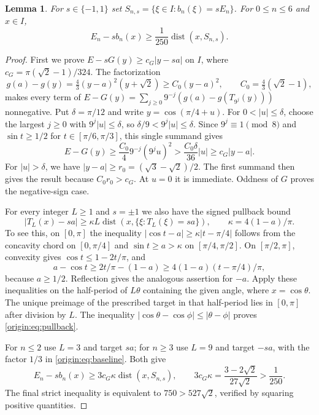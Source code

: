 \documentclass[11pt]{article}
\newtheorem{lemma}[theorem]{Lemma}
\theoremstyle{remark}\newtheorem{remark}[theorem]{Remark}
\newcommand{\dist}{\operatorname{dist}}
\begin{document}
\begin{lemma}\label{origin:lem:gap}
For $s\in\{-1,1\}$ set $S_{n,s}=\{\xi\in I:b_n(\xi)=sE_n\}$.
For $0\le n\le6$ and $x\in I$,
\[
 E_n-sb_n(x)\ge\frac1{250}\dist(x,S_{n,s}).
\]
\end{lemma}
\begin{proof}
First we prove $E-sG(y)\ge c_G|y-sa|$ on $I$, where
$c_G=\pi(\sqrt2-1)/324$. The factorization
\[
 g(a)-g(y)=\tfrac43(y-a)^2(y+\sqrt2)
       \ge C_0(y-a)^2,\qquad C_0=\tfrac43(\sqrt2-1),
\]
makes every term of $E-G(y)=\sum_{j\ge0}9^{-j}(g(a)-g(T_{9^j}(y)))$
nonnegative. Put $\delta=\pi/12$ and write $y=\cos(\pi/4+u)$.
For $0<|u|\le\delta$, choose the largest $j\ge0$ with
$9^j|u|\le\delta$, so $\delta/9<9^j|u|\le\delta$.
Since $9^j\equiv1\pmod8$ and $\sin t\ge1/2$ for
$t\in[\pi/6,\pi/3]$, this single summand gives
\[
 E-G(y)\ge \frac{C_0}{4}9^{-j}(9^ju)^2
     >\frac{C_0\delta}{36}|u|\ge c_G|y-a|.
\]
For $|u|>\delta$, we have $|y-a|\ge r_0=(\sqrt3-\sqrt2)/2$.
The first summand then gives the result because $C_0r_0>c_G$.
At $u=0$ it is immediate. Oddness of $G$ proves the negative-sign case.

For every integer $L\ge1$ and $s=\pm1$ we also have the signed pullback bound
\begin{equation}\label{origin:eq:pullback}
 |T_L(x)-sa|\ge\kappa L\dist(x,\{\xi:T_L(\xi)=sa\}),
 \qquad\kappa=4(1-a)/\pi.
\end{equation}
To see this, on $[0,\pi]$ the inequality
$|\cos t-a|\ge\kappa|t-\pi/4|$ follows from the concavity chord on
$[0,\pi/4]$ and $\sin t\ge a>\kappa$ on $[\pi/4,\pi/2]$.
On $[\pi/2,\pi]$, convexity gives $\cos t\le1-2t/\pi$, and
\[
 a-\cos t\ge 2t/\pi-(1-a)
               \ge 4(1-a)(t-\pi/4)/\pi,
\]
because $a\ge1/2$. Reflection gives the analogous assertion for $-a$.
Apply these inequalities on the half-period of $L\theta$ containing the
given angle, where $x=\cos\theta$. The unique preimage of the prescribed
target in that half-period lies in $[0,\pi]$ after division by $L$.
The inequality $|\cos\theta-\cos\phi|\le|\theta-\phi|$ proves
\eqref{origin:eq:pullback}.

For $n\le2$ use $L=3$ and target $sa$; for $n\ge3$ use $L=9$ and
target $-sa$, with the factor $1/3$ in \eqref{origin:eq:baseline}. Both give
\[
 E_n-sb_n(x)\ge 3c_G\kappa\dist(x,S_{n,s}),\qquad
 3c_G\kappa=\frac{3-2\sqrt2}{27\sqrt2}>\frac1{250}.
\]
The final strict inequality is equivalent to $750>527\sqrt2$, verified by
squaring positive quantities.
\end{proof}
\end{document}
